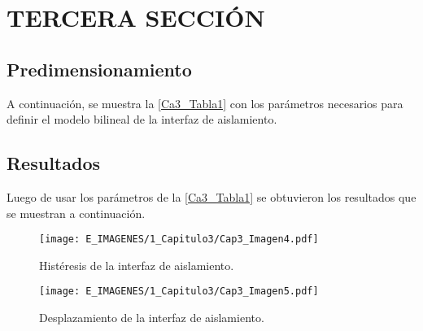 \section{TERCERA SECCIÓN}

\lipsum[10]
	
	\subsection{Predimensionamiento}

A continuación, se muestra la \autoref{Ca3_Tabla1} con los parámetros necesarios para definir el modelo bilineal de la interfaz de aislamiento.


	\subsection{Resultados} \label{subsection:Resul}

\lipsum[11]

Luego de usar los parámetros de la \autoref{Ca3_Tabla1} se obtuvieron los resultados que se muestran a continuación.
	
		\begin{figure}[!h]
	\centering
		\texttt{[image: E\_IMAGENES/1\_Capitulo3/Cap3\_Imagen4.pdf]}
		\vspace{-3 mm}
	\caption[Histéresis de la interfaz de aislamiento]{\centering\footnotesize Histéresis de la interfaz de aislamiento.}
	\label{Cap3_Figura4}
	\end{figure}
	

		\begin{figure}[!h]
	\centering
		\texttt{[image: E\_IMAGENES/1\_Capitulo3/Cap3\_Imagen5.pdf]}
		\vspace{-3 mm}
	\caption[Desplazamiento de la interfaz de aislamiento]{\centering\footnotesize Desplazamiento de la interfaz de aislamiento.}
	\label{Cap3_Figura5}
	\end{figure}
		

